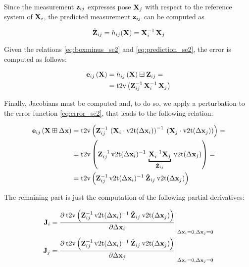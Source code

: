 Since the measurement $\mathbf{z}_{ij}$ expresses pose $\mathbf{X}_j$ with respect to the reference system of $\mathbf{X}_i$, the predicted measurement $\mathbf{z}_{ij}$ can be computed as 

\begin{equation}
    \label{eq:prediction_se2}
    \hat{\mathbf{Z}}_{ij} = h_{ij}(\mathbf{X}) = \mathbf{X}_i^{-1} \, \mathbf{X}_j
\end{equation}

\noindent Given the relations \ref{eq:boxminus_se2} and \ref{eq:prediction_se2}, the error is computed as follows:

\begin{align}
    \mathbf{e}_{ij}\left(\mathbf{X}\right) &= h_{ij}\left(\mathbf{X}\right) \boxminus \mathbf{Z}_{ij} = \nonumber \\
    &= \text{t2v}\left(\mathbf{Z}_{ij}^{-1}\, \mathbf{X}_i^{-1} \,\mathbf{X}_j\right)
    \label{eq:error_se2}
\end{align}

Finally, Jacobians must be computed and, to do so, we apply a perturbation to the error function \ref{eq:error_se2}, that leads to the following relation:

\begin{align}
    \error_{ij}\left(\SState \boxplus \dx\right) &= \text{t2v}\left(\Meas_{ij}^{-1} \, \left(\SState_i\cdot\v2t(\dx_i)\right)^{-1}\: \left(\SState_j\cdot\v2t(\dx_j)\right) \right) = \nonumber\\
    &= \text{t2v}\left(\Meas_{ij}^{-1} \, \v2t(\dx_i)^{-1}\: \underbracket{\SState_i^{-1}\SState_j}_{\Pred_{ij}} \:\v2t(\dx_j) \right) = \nonumber \\
    &= \text{t2v}\left(\Meas_{ij}^{-1} \, \v2t(\dx_i)^{-1}\: \Pred_{ij} \:\v2t(\dx_j) \right)
    \label{eq:error_perturbation_se2}
\end{align}

\noindent The remaining part is just the computation of the following partial derivatives:

\begin{align}
    \label{eq:jac_i_se2}
    \jacob_i = \frac{\partial\: \text{t2v}\left(\Meas_{ij}^{-1} \, \v2t(\dx_i)^{-1}\: \Pred_{ij} \:\v2t(\dx_j) \right)}{\partial \dx_i} \Bigg\rvert_{\dx_i = 0, \dx_j=0} \\
    \label{eq:jac_j_se2}
    \jacob_j = \frac{\partial\: \text{t2v}\left(\Meas_{ij}^{-1} \, \v2t(\dx_i)^{-1}\: \Pred_{ij} \:\v2t(\dx_j) \right)}{\partial \dx_j} \Bigg\rvert_{\dx_i = 0, \dx_j=0}
\end{align}

